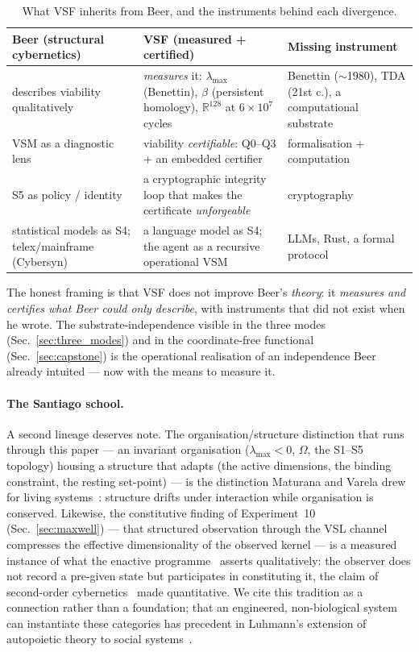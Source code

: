 \documentclass[11pt, a4paper]{article}
\newcommand{\R}{\mathbb{R}}
\begin{document}
\begin{table}[!htb]
\centering
\small
\begin{tabular}{p{4.6cm}p{5.0cm}p{3.6cm}}
\toprule
Beer (structural cybernetics) & VSF (measured + certified) & Missing instrument \\
\midrule
describes viability qualitatively & \emph{measures} it: $\lambda_\text{max}$ (Benettin), $\beta$ (persistent homology), $\R^{128}$ at $6\times 10^7$ cycles & Benettin ($\sim$1980), TDA (21st c.), a computational substrate \\
VSM as a diagnostic lens & viability \emph{certifiable}: Q0--Q3 + an embedded certifier & formalisation + computation \\
S5 as policy / identity & a cryptographic integrity loop that makes the certificate \emph{unforgeable} & cryptography \\
statistical models as S4; telex/mainframe (Cybersyn) & a language model as S4; the agent as a recursive operational VSM & LLMs, Rust, a formal protocol \\
\bottomrule
\end{tabular}
\caption{What VSF inherits from Beer, and the instruments behind each divergence.}
\label{tab:beer_divergence}
\end{table}

The honest framing is that VSF does not improve Beer's \emph{theory}: it
\emph{measures and certifies what Beer could only describe}, with instruments
that did not exist when he wrote. The substrate-independence visible in the
three modes (Sec.~\ref{sec:three_modes}) and in the coordinate-free functional
(Sec.~\ref{sec:capstone}) is the operational realisation of an independence Beer
already intuited --- now with the means to measure it.

\paragraph{The Santiago school.}
A second lineage deserves note. The organisation/structure distinction that
runs through this paper --- an invariant organisation ($\lambda_\text{max}<0$,
$\Omega$, the S1--S5 topology) housing a structure that adapts (the active
dimensions, the binding constraint, the resting set-point) --- is the
distinction Maturana and Varela drew for living systems~\cite{maturana1987tree}:
structure drifts under interaction while organisation is conserved. Likewise,
the constitutive finding of Experiment~10 (Sec.~\ref{sec:maxwell}) --- that
structured observation through the VSL channel compresses the effective
dimensionality of the observed kernel --- is a measured instance of what the
enactive programme~\cite{varela1991embodied} asserts qualitatively: the
observer does not record a pre-given state but participates in constituting
it, the claim of second-order cybernetics~\cite{vonfoerster1974cybernetics}
made quantitative. We cite this tradition as a connection rather than a
foundation; that an engineered, non-biological system can instantiate these
categories has precedent in Luhmann's extension of autopoietic theory to
social systems~\cite{luhmann1995social}.
\end{document}
